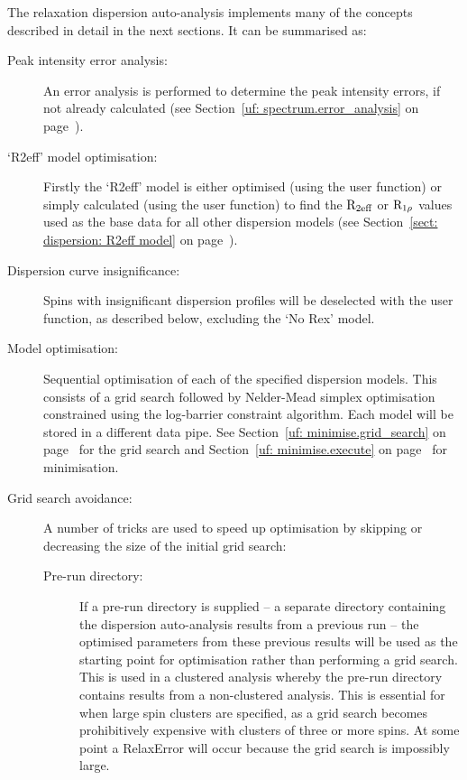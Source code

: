 The relaxation dispersion auto-analysis implements many of the concepts described in detail in the next sections.
It can be summarised as:
\begin{description}
  \item[Peak intensity error analysis:]  An error analysis is performed to determine the peak intensity errors, if not already calculated (see Section~\ref{uf: spectrum.error_analysis} on page~\pageref{uf: spectrum.error_analysis}).
  \item[`R2eff' model optimisation:]  Firstly the `R2eff' model is either optimised (using the  user function) or simply calculated (using the  user function) to find the $\mathrm{R}_{\textrm{2eff}}$ or $\mathrm{R}_{1\rho}$ values used as the base data for all other dispersion models (see Section~\ref{sect: dispersion: R2eff model} on page~\pageref{sect: dispersion: R2eff model}).
  \item[Dispersion curve insignificance:]  Spins with insignificant dispersion profiles will be deselected with the  user function, as described below, excluding the `No Rex' model.
  \item[Model optimisation:]  Sequential optimisation of each of the specified dispersion models.
    This consists of a grid search followed by Nelder-Mead simplex optimisation constrained using the log-barrier constraint algorithm.
    Each model will be stored in a different data pipe.
    See Section~\ref{uf: minimise.grid_search} on page~\pageref{uf: minimise.grid_search} for the grid search and Section~\ref{uf: minimise.execute} on page~\pageref{uf: minimise.execute} for minimisation.
  \item[Grid search avoidance:]  A number of tricks are used to speed up optimisation by skipping or decreasing the size of the initial grid search:
  \begin{description}
    \item[Pre-run directory:]  If a pre-run directory is supplied -- a separate directory containing the dispersion auto-analysis results from a previous run -- the optimised parameters from these previous results will be used as the starting point for optimisation rather than performing a grid search.
      This is used in a clustered analysis whereby the pre-run directory contains results from a non-clustered analysis.
      This is essential for when large spin clusters are specified, as a grid search becomes prohibitively expensive with clusters of three or more spins.
      At some point a RelaxError will occur because the grid search is impossibly large.

\end{description}
\end{description}
